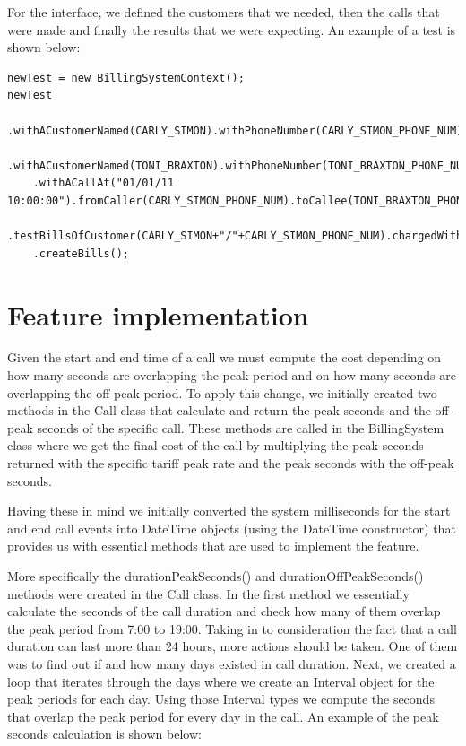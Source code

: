\documentclass[pdftex,11pt,a4paper]{article}
\begin{document}
For the interface, we defined the customers that we needed, then the calls that were made and finally the results that we were expecting. An example of a test is shown below: 

\begin{lstlisting}
newTest = new BillingSystemContext();
newTest
	.withACustomerNamed(CARLY_SIMON).withPhoneNumber(CARLY_SIMON_PHONE_NUM).andPricePlan(STANDARD_TARIFF)
	.withACustomerNamed(TONI_BRAXTON).withPhoneNumber(TONI_BRAXTON_PHONE_NUM).andPricePlan(BUSINESS_TARIFF)
	.withACallAt("01/01/11 10:00:00").fromCaller(CARLY_SIMON_PHONE_NUM).toCallee(TONI_BRAXTON_PHONE_NUM).thatLastsForSecond(60)
	.testBillsOfCustomer(CARLY_SIMON+"/"+CARLY_SIMON_PHONE_NUM).chargedWithPricePlan(STANDARD_TARIFF).forPeakSeconds(60).andOffPeakSeconds(0)
	.createBills();
\end{lstlisting}

\section{Feature implementation}
Given the start and end time of a call we must compute the cost depending on how many seconds are overlapping the peak period and on how many seconds are overlapping the off-peak period. To apply this change, we initially created two methods in the Call class that calculate and return the peak seconds and the off-peak seconds of the specific call. These methods are called in the BillingSystem class where we get the final cost of the call by multiplying the peak seconds returned with the specific tariff peak rate and the peak seconds with the off-peak seconds.

Having these in mind we initially converted the system milliseconds for the start and end call events into DateTime objects (using the DateTime constructor) that provides us with essential methods that are used to implement the feature.

More specifically the durationPeakSeconds() and  durationOffPeakSeconds() methods were created in the Call class. In the first method we essentially calculate the seconds of the call duration and check how many of them overlap the peak period from 7:00 to 19:00. Taking in to consideration the fact that a call duration can last more than 24 hours, more actions should be taken. One of them was to find out if and how many days existed in call duration. Next, we created a loop that iterates through the days where we create an Interval object for the peak periods for each day. Using those Interval types we compute the seconds that overlap the peak period for every day in the call. An example of the peak seconds calculation is shown below:
\end{document}
